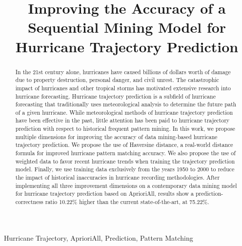 \documentclass[12pt,conference]{IEEEtran}
\begin{document}
\raggedbottom

\title{Improving the Accuracy of a Sequential Mining Model for Hurricane Trajectory Prediction}

\author{
}

\maketitle

\begin{abstract}

In the 21st century alone, hurricanes have caused billions of dollars worth of damage due to property destruction, personal danger, and civil unrest. The catastrophic impact of hurricanes and other tropical storms has motivated extensive research into hurricane forecasting. Hurricane trajectory prediction is a subfield of hurricane forecasting that traditionally uses meteorological analysis to determine the future path of a given hurricane. While meteorological methods of hurricane trajectory prediction have been effective in the past, little attention has been paid to hurricane trajectory prediction with respect to historical frequent pattern mining. In this work, we propose multiple dimensions for improving the accuracy of data mining-based hurricane trajectory prediction. We propose the use of Haversine distance, a real-world distance formula for improved hurricane pattern matching accuracy. We also propose the use of weighted data to favor recent hurricane trends when training the trajectory prediction model. Finally, we use training data exclusively from the years 1950 to 2000 to reduce the impact of historical inaccuracies in hurricane recording methodologies. After implementing all three improvement dimensions on a contemporary data mining model for hurricane trajectory prediction based on AprioriAll, results show a prediction-correctness ratio 10.22\% higher than the current state-of-the-art, at 75.22\%.

\end{abstract}

\begin{IEEEkeywords}
Hurricane Trajectory, AprioriAll, Prediction, Pattern Matching
\end{IEEEkeywords}
\end{document}
